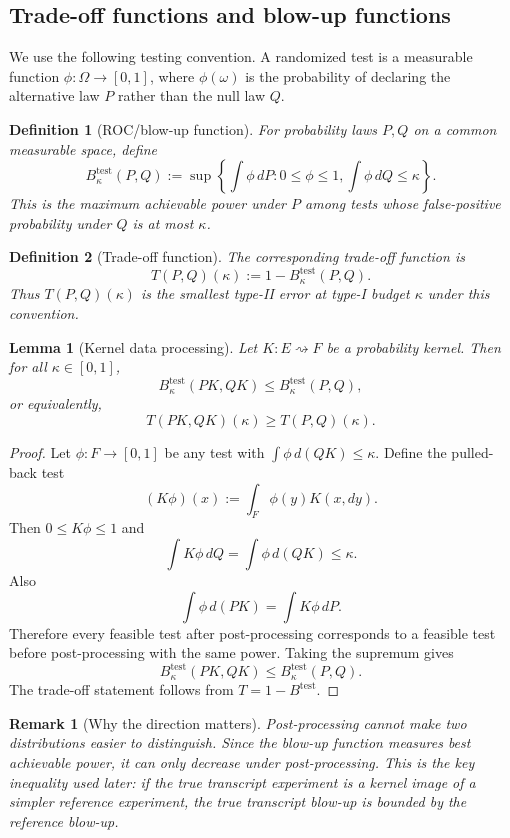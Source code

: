 \documentclass[conference,compsoc]{IEEEtran}
\newtheorem{definition}{Definition}
\newtheorem{lemma}{Lemma}
\newtheorem{remark}{Remark}
\begin{document}
\subsection{Trade-off functions and blow-up functions}

We use the following testing convention. A randomized test is a measurable function $\phi:\Omega\to[0,1]$, where $\phi(\omega)$ is the probability of declaring the alternative law $P$ rather than the null law $Q$.

\begin{definition}[ROC/blow-up function]
For probability laws $P,Q$ on a common measurable space, define
\[
B_\kappa^{\mathrm{test}}(P,Q)
:=
\sup\left\{\int \phi\,dP:
0\le\phi\le 1,
\int \phi\,dQ\le \kappa
\right\}.
\]
This is the maximum achievable power under $P$ among tests whose false-positive probability under $Q$ is at most $\kappa$.
\end{definition}

\begin{definition}[Trade-off function]
The corresponding trade-off function is
\[
T(P,Q)(\kappa):=1-B_\kappa^{\mathrm{test}}(P,Q).
\]
Thus $T(P,Q)(\kappa)$ is the smallest type-II error at type-I budget $\kappa$ under this convention.
\end{definition}

\begin{lemma}[Kernel data processing]
\label{lem:kernel-dp}
Let $K:E\rightsquigarrow F$ be a probability kernel. Then for all $\kappa\in[0,1]$,
\[
B_\kappa^{\mathrm{test}}(PK,QK)\le B_\kappa^{\mathrm{test}}(P,Q),
\]
or equivalently,
\[
T(PK,QK)(\kappa)\ge T(P,Q)(\kappa).
\]
\end{lemma}

\begin{proof}
Let $\phi:F\to[0,1]$ be any test with $\int\phi\,d(QK)\le\kappa$. Define the pulled-back test
\[
(K\phi)(x):=\int_F \phi(y)K(x,dy).
\]
Then $0\le K\phi\le1$ and
\[
\int K\phi\,dQ=\int\phi\,d(QK)\le\kappa.
\]
Also
\[
\int\phi\,d(PK)=\int K\phi\,dP.
\]
Therefore every feasible test after post-processing corresponds to a feasible test before post-processing with the same power. Taking the supremum gives
\[
B_\kappa^{\mathrm{test}}(PK,QK)\le B_\kappa^{\mathrm{test}}(P,Q).
\]
The trade-off statement follows from $T=1-B^{\mathrm{test}}$.
\end{proof}

\begin{remark}[Why the direction matters]
Post-processing cannot make two distributions easier to distinguish. Since the blow-up function measures best achievable power, it can only decrease under post-processing. This is the key inequality used later: if the true transcript experiment is a kernel image of a simpler reference experiment, the true transcript blow-up is bounded by the reference blow-up.
\end{remark}
\end{document}
